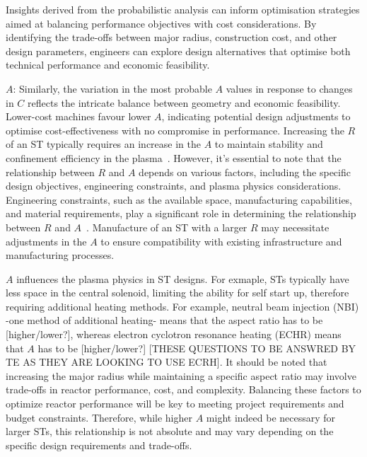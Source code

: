 \documentclass[journal]{IEEEtran}
\begin{document}
Insights derived from the probabilistic analysis can inform optimisation strategies aimed at balancing performance objectives with cost considerations. By identifying the trade-offs between major radius, construction cost, and other design parameters, engineers can explore design alternatives that optimise both technical performance and economic feasibility.

\textbf{$A$}: Similarly, the variation in the most probable $A$ values in response to changes in $C$ reflects the intricate balance between geometry and economic feasibility. Lower-cost machines favour lower $A$, indicating potential design adjustments to optimise cost-effectiveness with no compromise in performance. Increasing the $R$ of an ST typically requires an increase in the $A$ to maintain stability and confinement efficiency in the plasma~\cite{Costley2021}. However, it's essential to note that the relationship between $R$ and $A$ depends on various factors, including the specific design objectives, engineering constraints, and plasma physics considerations. Engineering constraints, such as the available space, manufacturing capabilities, and material requirements, play a significant role in determining the relationship between $R$ and $A$~\cite{Costley2021}. Manufacture of an ST with a larger $R$ may necessitate adjustments in the $A$ to ensure compatibility with existing infrastructure and manufacturing processes. 

$A$ influences the plasma physics in ST designs. For exmaple, STs typically have less space in the central solenoid, limiting the ability for self start up, therefore requiring additional heating methods. For example, neutral beam injection (NBI) -one method of additional heating- means that the aspect ratio has to be [higher/lower?], whereas electron cyclotron resonance heating (ECHR) means that $A$ has to be [higher/lower?] [THESE QUESTIONS TO BE ANSWRED BY TE AS THEY ARE LOOKING TO USE ECRH]. It should be noted that increasing the major radius while maintaining a specific aspect ratio may involve trade-offs in reactor performance, cost, and complexity. Balancing these factors to optimize reactor performance will be key to meeting project requirements and budget constraints. Therefore, while higher $A$ might indeed be necessary for larger STs, this relationship is not absolute and may vary depending on the specific design requirements and trade-offs.
\end{document}
